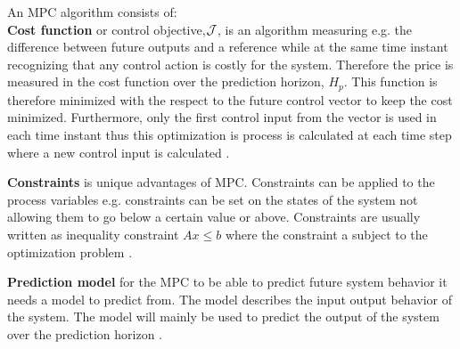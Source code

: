 An MPC algorithm consists of:
\\ 
\textbf{Cost function} or control objective,$\CMcal{J}$, is an algorithm measuring e.g. the difference between future outputs and a reference while at the same time instant recognizing that any control action is costly for the system. Therefore the price is measured in the cost function over the prediction horizon, $H_p$. This function is therefore minimized with the respect to the future control vector to keep the cost minimized. Furthermore, only the first control input from the vector is used in each time instant thus this optimization is process is calculated at each time step where a new control input is calculated \cite{mpc_control_lecture_notes}.

\textbf{Constraints} is unique advantages of MPC. Constraints can be applied to the process variables e.g. constraints can be set on the states of the system not allowing them to go below a certain value or above. Constraints are usually written as inequality constraint $Ax\leq b$ where the constraint a subject to the optimization problem \cite{mpc_control_lecture_notes}.   

\textbf{Prediction model} for the MPC to be able to predict future system behavior it needs a model to predict from. The model describes the input output behavior of the system. The model will mainly be used to predict the output of the system over the prediction horizon \cite{mpc_control_lecture_notes}.  





